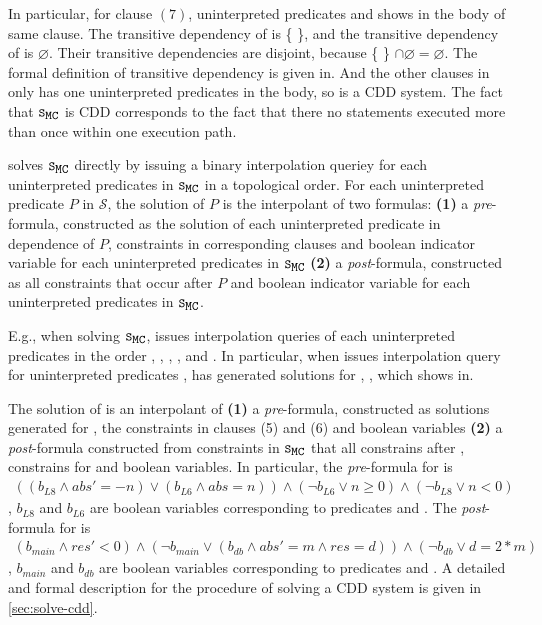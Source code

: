 In particular, for clause $(7)$, uninterpreted predicates  and  shows in
the body of same clause.
%
The transitive dependency of  is \{\,\,\}, 
and the transitive dependency of  is $\varnothing$.
%
Their transitive dependencies are disjoint, because \{\,\,\} $\cap \varnothing = \varnothing$.
%
The formal definition of transitive dependency is given in.
%
And the other clauses in  only has one uninterpreted predicates in the body, so
 is a CDD system.
%
The fact that $\mcchc$ is CDD corresponds to the fact that there no statements executed more than
once within one execution path.
%

\sys solves $\mcchc$ directly by issuing a binary 
interpolation queriey for each uninterpreted predicates in $\mcchc$ in a topological order.
%
For each uninterpreted predicate $P$ in $\mathcal{S}$, the solution of
$P$ is the interpolant of two formulas: %
\textbf{(1)} a \emph{pre}-formula, constructed as 
the solution of each uninterpreted predicate in dependence of $P$, constraints
in corresponding clauses and boolean indicator variable for 
each uninterpreted predicates in $\mcchc$%
\textbf{(2)} a \emph{post}-formula, constructed as  
all constraints that occur after $P$ and boolean indicator variable for 
each uninterpreted predicates in $\mcchc$.
%

E.g., when \sys solving $\mcchc$, \sys issues interpolation queries of 
each uninterpreted predicates in the order , , , 
,  and .
%
In particular, when \sys issues interpolation query for uninterpreted predicates ,
\sys has generated solutions for , ,  which shows in.
%

The solution of  is an interpolant of \textbf{(1)} 
a \emph{pre}-formula, constructed as solutions generated for , 
the constraints in clauses (5) and (6) and boolean variables%
\textbf{(2)} a \emph{post}-formula constructed from constraints in
$\mcchc$ that all constrains after , constrains for 
and boolean variables.
%
In particular, the \emph{pre}-formula for  is 
\begin{gather}
((b_{L8}\land abs'= -n) \lor (b_{L6} \land abs=n))\land (\neg b_{L6} \lor n \ge 0) \land (\neg b_{L8} \lor n<0)
\end{gather}
%
, $b_{L8}$ and $b_{L6}$ are boolean variables corresponding to predicates  and .
%
The \emph{post}-formula for  is
\begin{gather}
(b_{main} \land res' < 0 ) \land (\neg b_{main} \lor (b_{db} \land abs'= m \land res =d )) 
\land (\neg b_{db} \lor d = 2*m)
\end{gather}
, $b_{main}$ and $b_{db}$ are boolean variables corresponding to predicates  and .
%
A detailed and formal description for the procedure of solving a CDD system is given in
\autoref{sec:solve-cdd}.


